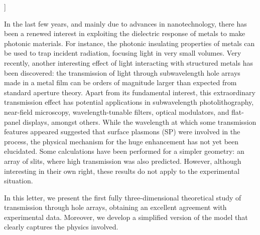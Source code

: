 ]

\narrowtext

In the last few years, and mainly due to advances in nanotechnology,
there has been a renewed interest in exploiting the dielectric response of
metals to make photonic materials\cite{Pendry99,Fan96,Sievenpiper98}.
For instance, the photonic
insulating properties of metals can be used to trap incident radiation,
focusing light in very small 
volumes\cite{Barnes96,Garcia96,Krenn99}. 
Very recently\cite{Ebbesen}, another interesting effect of light 
interacting with structured metals has been discovered:
the transmission of light through subwavelength hole arrays made
in a metal film can be orders of magnitude larger than 
expected from standard aperture theory\cite{Bethe44}.
Apart from its fundamental interest,
this extraordinary transmission effect has  
potential applications\cite{Sambles98,Thio00} in subwavelength 
photolithography, near-field
microscopy, wavelength-tunable filters, optical modulators, and flat-panel
displays, amongst others. While the wavelength at which some transmission
features appeared suggested\cite{Ebbesen,Grupp00} that 
surface plasmons (SP)\cite{Rather88} were involved in the
process, the physical mechanism for the huge 
enhancement has not yet been
elucidated. Some calculations have been performed for
a simpler geometry: an array of 
slits\cite{Schroter98,Treacy99,Porto99}, where high transmission was also
predicted.
However, although interesting in their own right, these results do not apply
to the experimental situation. 

In this letter, we present the first fully three-dimensional
theoretical study of transmission through hole arrays, obtaining an excellent
agreement with experimental data. Moreover, we develop a
simplified version of the model that clearly captures the physics involved.

